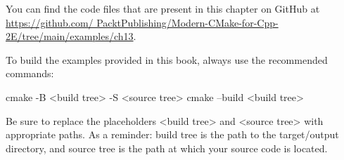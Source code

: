 You can find the code files that are present in this chapter on GitHub at \url{https://github.com/ PacktPublishing/Modern-CMake-for-Cpp-2E/tree/main/examples/ch13}.

To build the examples provided in this book, always use the recommended commands:

\begin{shell}
cmake -B <build tree> -S <source tree>
cmake --build <build tree>
\end{shell}

Be sure to replace the placeholders <build tree> and <source tree> with appropriate paths. As a reminder: build tree is the path to the target/output directory, and source tree is the path at which your source code is located.

